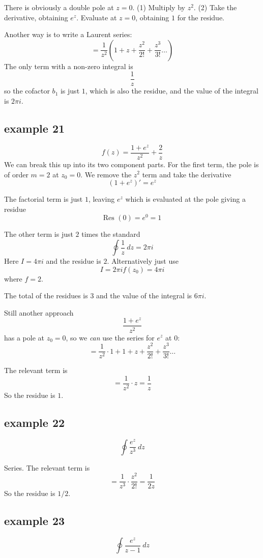 \documentclass[11pt, oneside]{article}
\begin{document}
There is obviously a double pole at $z = 0$.  (1) Multiply by $z^2$.  (2) Take the derivative, obtaining $e^z$.  Evaluate at $z = 0$, obtaining $1$ for the residue.

Another way is to write a Laurent series:
\[ = \frac{1}{z^2} (1 + z + \frac{z^2}{2!} + \frac{z^3}{3!} \dots ) \]
The only term with a non-zero integral is\
\[ \frac{1}{z} \]
so the cofactor $b_1$ is just $1$, which is also the residue, and the value of the integral is $2 \pi i$.

\subsection*{example 21}

\[ f(z) = \frac{1 + e^z}{z^2} + \frac{2}{z} \]
We can break this up into its two component parts.  For the first term, the pole is of order $m = 2$ at $z_0 = 0$.  We remove the $z^2$ term and take the derivative
\[ (1 + e^z)' = e^z \]

The factorial term is just $1$, leaving $e^z$ which is evaluated at the pole giving a residue
\[ \text{Res }(0) = e^0 = 1 \]

The other term is just $2$ times the standard
\[ \oint \frac{1}{z} \ dz = 2 \pi i \]
Here $I = 4 \pi i$ and the residue is $2$.  Alternatively just use
\[ I = 2 \pi i f(z_0) = 4 \pi i \]
where $f = 2$.

The total of the residues is $3$ and the value of the integral is $6 \pi i$.

Still another approach
\[ \frac{1 + e^z}{z^2} \]
has a pole at $z_0 = 0$, so we \emph{can} use the series for $e^z$ at $0$:
\[ = \frac{1}{z^2} \cdot 1 + 1 + z + \frac{z^2}{2!} + \frac{z^3}{3!} \dots \]

The relevant term is 
\[ = \frac{1}{z^2} \cdot  z = \frac{1}{z} \]
So the residue is $1$.

\subsection*{example 22}  
\[ \oint \frac{e^z}{z^3} \ dz \]

Series.  The relevant term is 
\[ = \frac{1}{z^3} \cdot  \frac{z^2}{2!} = \frac{1}{2z} \]
So the residue is $1/2$.

\subsection*{example 23}
\[ \oint \frac{e^z}{z - 1} \ dz \]
\end{document}
